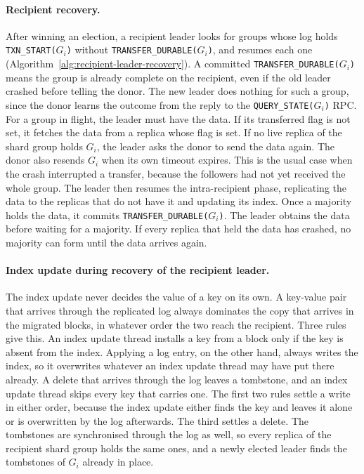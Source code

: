 \begin{figure}[t]
  \begin{minipage}[t]{0.48\textwidth}
    
  \end{minipage}\hfill
  \begin{minipage}[t]{0.48\textwidth}
    
  \end{minipage}
\end{figure}

\paragraph{Recipient recovery.}
After winning an election, a recipient leader looks for groups whose log holds \texttt{TXN\_START($G_i$)} without \texttt{TRANSFER\_DURABLE($G_i$)}, and resumes each one (Algorithm~\ref{alg:recipient-leader-recovery}).
A committed \texttt{TRANSFER\_DURABLE($G_i$)} means the group is already complete on the recipient, even if the old leader crashed before telling the donor.
The new leader does nothing for such a group, since the donor learns the outcome from the reply to the \texttt{QUERY\_STATE($G_i$)} RPC.
For a group in flight, the leader must have the data.
If its transferred flag is not set, it fetches the data from a replica whose flag is set.
If no live replica of the shard group holds $G_i$, the leader asks the donor to send the data again.
The donor also resends $G_i$ when its own timeout expires.
This is the usual case when the crash interrupted a transfer, because the followers had not yet received the whole group.
The leader then resumes the intra-recipient phase, replicating the data to the replicas that do not have it and updating its index.
Once a majority holds the data, it commits \texttt{TRANSFER\_DURABLE($G_i$)}.
The leader obtains the data before waiting for a majority.
If every replica that held the data has crashed, no majority can form until the data arrives again.


\paragraph{Index update during recovery of the recipient leader.}
The index update never decides the value of a key on its own.
A key-value pair that arrives through the replicated log always dominates the copy that arrives
in the migrated blocks, in whatever order the two reach the recipient.
Three rules give this.
An index update thread installs a key from a block only if the key is absent from the index.
Applying a log entry, on the other hand, always writes the index, so it overwrites whatever an
index update thread may have put there already.
A delete that arrives through the log leaves a tombstone, and an index update thread skips
every key that carries one.
The first two rules settle a write in either order, because the index update either finds the
key and leaves it alone or is overwritten by the log afterwards.
The third settles a delete.
The tombstones are synchronised through the log as well, so every replica of the recipient
shard group holds the same ones, and a newly elected leader finds the tombstones of $G_i$
already in place.

